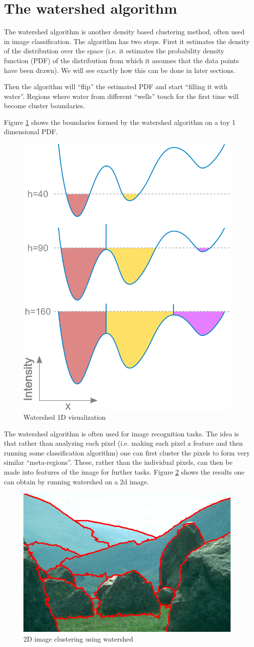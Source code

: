 \section{The watershed algorithm}
  The watershed algorithm is another density based clustering method, often used in image classification.
  The algorithm has two steps. First it estimates the density of the distribution over the space (i.e. 
  it estimates the probability density function (PDF) of the distribution from which it assumes that the data points
  have been drawn). We will see exactly how this can be done in later sections. 
  
  Then the algorithm will ``flip'' the estimated PDF and start ``filling it with water''. Regions where water from different
  ``wells'' touch for the first time will become cluster boundaries.
  
  Figure \ref{watershed 1d} shows the boundaries formed by the watershed algorithm on a toy 1 dimensional PDF.
  
  \begin{figure}[h]
  \centering
  \includegraphics[width=.4\linewidth]{chapter_2/files/Watershed-flooding-graph.png}
  \caption{Watershed 1D visualization }
  \label{watershed 1d}
  \end{figure}
  
  The watershed algorithm is often used for image recognition tasks. The idea is that rather than 
  analyzing each pixel (i.e. making each pixel a feature and then running some classification algorithm)
  one can first cluster the pixels to form very similar ``meta-regions''. These, rather than the individual pixels,
  can then be made into features of the image for further tasks. Figure \ref{watershed on image} shows the results one can
  obtain by running watershed on a 2d image.
  
  \begin{figure}[h]
  \centering
  \includegraphics[width=.4\linewidth]{chapter_2/files/PW_overlay.png}
  \caption{2D image clustering using watershed}
  \label{watershed on image}
  \end{figure}
